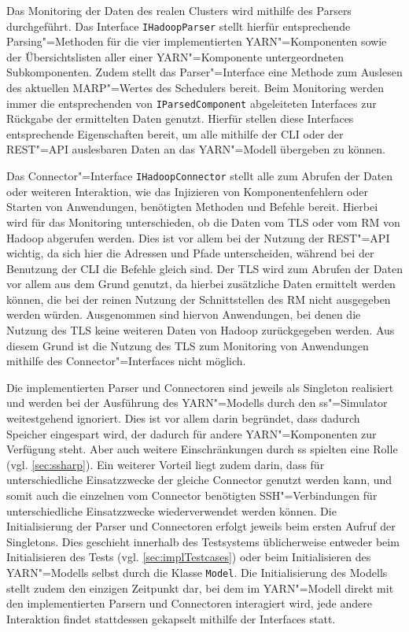 Das Monitoring der Daten des realen Clusters wird mithilfe des Parsers durchgeführt.
Das Interface \texttt{IHadoopParser} stellt hierfür entsprechende Parsing"=Methoden für die vier implementierten YARN"=Komponenten sowie der Übersichtslisten aller einer YARN"=Komponente untergeordneten Subkomponenten.
Zudem stellt das Parser"=Interface eine Methode zum Auslesen des aktuellen \gls{MARP}"=Wertes des Schedulers bereit.
Beim Monitoring werden immer die entsprechenden von \texttt{IParsedComponent} abgeleiteten Interfaces zur Rückgabe der ermittelten Daten genutzt.
Hierfür stellen diese Interfaces entsprechende Eigenschaften bereit, um alle mithilfe der \gls{CLI} oder der REST"=API auslesbaren Daten an das YARN"=Modell übergeben zu können.

Das Connector"=Interface \texttt{IHadoopConnector} stellt alle zum Abrufen der Daten oder weiteren Interaktion, wie das Injizieren von Komponentenfehlern oder Starten von Anwendungen, benötigten Methoden und Befehle bereit.
Hierbei wird für das Monitoring unterschieden, ob die Daten vom \gls{TLS} oder vom \gls{RM} von Hadoop abgerufen werden.
Dies ist vor allem bei der Nutzung der REST"=API wichtig, da sich hier die Adressen und Pfade unterscheiden, während bei der Benutzung der \gls{CLI} die Befehle gleich sind.
Der \gls{TLS} wird zum Abrufen der Daten vor allem aus dem Grund genutzt, da hierbei zusätzliche Daten ermittelt werden können, die bei der reinen Nutzung der Schnittstellen des \gls{RM} nicht ausgegeben werden würden.
Ausgenommen sind hiervon Anwendungen, bei denen die Nutzung des \gls{TLS} keine weiteren Daten von Hadoop zurückgegeben werden\cite{HadoopYarnTlServer271,HadoopYarnCmds271,HadoopRmApi271,HadoopNmApi271}.
Aus diesem Grund ist die Nutzung des \gls{TLS} zum Monitoring von Anwendungen mithilfe des Connector"=Interfaces nicht möglich.

Die implementierten Parser und Connectoren sind jeweils als Singleton realisiert und werden bei der Ausführung des YARN"=Modells durch den \gls{ss}"=Simulator weitestgehend ignoriert.
Dies ist vor allem darin begründet, dass dadurch Speicher eingespart wird, der dadurch für andere YARN"=Komponenten zur Verfügung steht.
Aber auch weitere Einschränkungen durch \gls{ss} spielten eine Rolle (vgl. \cref{sec:ssharp}).
Ein weiterer Vorteil liegt zudem darin, dass für unterschiedliche Einsatzzwecke der gleiche Connector genutzt werden kann, und somit auch die einzelnen vom Connector benötigten SSH"=Verbindungen für unterschiedliche Einsatzzwecke wiederverwendet werden können.
Die Initialisierung der Parser und Connectoren erfolgt jeweils beim ersten Aufruf der Singletons.
Dies geschieht innerhalb des Testsystems üblicherweise entweder beim Initialisieren des Tests (vgl. \cref{sec:implTestcases}) oder beim Initialisieren des YARN"=Modells selbst durch die Klasse \texttt{Model}.
Die Initialisierung des Modells stellt zudem den einzigen Zeitpunkt dar, bei dem im YARN"=Modell direkt mit den implementierten Parsern und Connectoren interagiert wird, jede andere Interaktion findet stattdessen gekapselt mithilfe der Interfaces statt.

